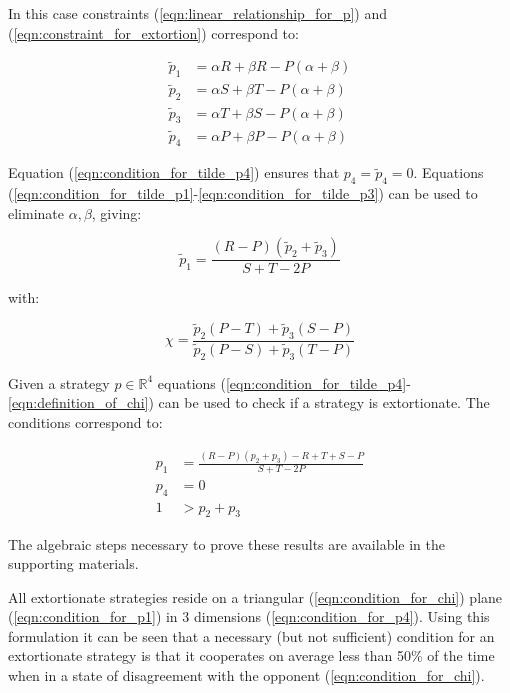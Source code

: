 \documentclass[a4paper]{article}
\begin{document}
In this case constraints (\ref{eqn:linear_relationship_for_p}) and
(\ref{eqn:constraint_for_extortion}) correspond to:

\begin{align}
    \tilde p_1 & = \alpha R + \beta R - P (\alpha + \beta)
            \label{eqn:condition_for_tilde_p1}\\
    \tilde p_2 & = \alpha S + \beta T - P (\alpha + \beta)
            \label{eqn:condition_for_tilde_p2}\\
    \tilde p_3 & = \alpha T + \beta S - P (\alpha + \beta)
            \label{eqn:condition_for_tilde_p3}\\
    \tilde p_4 & = \alpha P + \beta P - P (\alpha + \beta)
            \label{eqn:condition_for_tilde_p4}
\end{align}

Equation (\ref{eqn:condition_for_tilde_p4}) ensures that \(p_4=\tilde p_4=0\).
Equations (\ref{eqn:condition_for_tilde_p1}-\ref{eqn:condition_for_tilde_p3})
can be used to eliminate \(\alpha, \beta\), giving:

\begin{equation}\label{eqn:planar_definition_of_extortion}
    \tilde p_1 = \frac{(R - P)(\tilde p_2 + \tilde p_3)}{S + T - 2P}
\end{equation}

with:

\begin{equation}\label{eqn:definition_of_chi}
    \chi = \frac{\tilde p_2 (P - T) + \tilde p_3 (S - P)}
                {\tilde p_2 (P - S) + \tilde p_3 (T - P)}
\end{equation}

Given a strategy \(p\in\mathbb{R}^{4}\) equations
(\ref{eqn:condition_for_tilde_p4}-\ref{eqn:definition_of_chi}) can be used to
check if a strategy is extortionate. The conditions correspond to:

\begin{align}
    p_1 & = \frac{(R-P)(p_2 + p_3) - R + T + S - P}{S + T - 2P}
     \label{eqn:condition_for_p1}\\
    p_4 & = 0 \label{eqn:condition_for_p4}\\
    1 & > p_2 + p_3\label{eqn:condition_for_chi}
\end{align}

The algebraic steps necessary to prove these results are available in the
supporting materials.

All extortionate strategies reside on a triangular (\ref{eqn:condition_for_chi})
plane (\ref{eqn:condition_for_p1}) in 3 dimensions (\ref{eqn:condition_for_p4}).
Using this formulation it can be seen that a necessary (but not sufficient)
condition for an extortionate strategy is that it cooperates on average less
than 50\% of the time when in a state of disagreement with the opponent
(\ref{eqn:condition_for_chi}).
\end{document}
